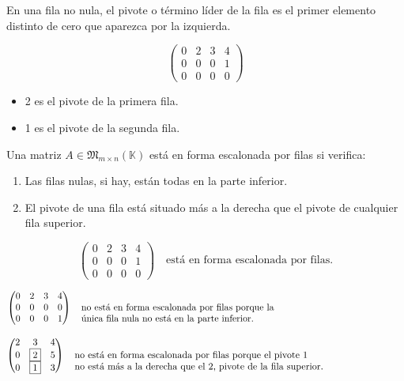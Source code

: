 \documentclass[a4paper,12pt]{article}
\begin{document}
\begin{procedimiento}[title=Pivote o término líder]
En una fila no nula, el pivote o término líder de la fila es el primer elemento distinto de cero que aparezca por la izquierda.
\end{procedimiento}

\begin{ejemplo}[title=Ejemplo de pivote]
\[
\begin{pmatrix}
0 & \boxed{2} & 3 & 4 \\
0 & 0 & 0 & \boxed{1} \\
0 & 0 & 0 & 0
\end{pmatrix}
\]

\begin{itemize}
\item 2 es el pivote de la primera fila.
\item 1 es el pivote de la segunda fila.
\end{itemize}
\end{ejemplo}

\begin{procedimiento}[title=Forma escalonada por filas]
Una matriz $A \in \mathfrak{M}_{m \times n}(\mathbb{K})$ está en forma escalonada por filas si verifica:
\begin{enumerate}
\item Las filas nulas, si hay, están todas en la parte inferior.
\item El pivote de una fila está situado más a la derecha que el pivote de cualquier fila superior.
\end{enumerate}
\end{procedimiento}

\begin{ejemplo}[title=Ejemplos de forma escalonada por filas]
\[
\begin{pmatrix}
0 & 2 & 3 & 4 \\
0 & 0 & 0 & 1 \\
0 & 0 & 0 & 0
\end{pmatrix}
\quad \text{está en forma escalonada por filas.}
\]

\[
\begin{pmatrix}
0 & 2 & 3 & 4 \\
0 & 0 & 0 & 0 \\
0 & 0 & 0 & 1
\end{pmatrix}
\quad
\text{\parbox[t]{1\textwidth}{no está en forma escalonada por filas porque la \\ única fila nula no está en la parte inferior.}}
\]

\[
\begin{pmatrix}
2 & 3 & 4 \\
0 & \boxed{2} & 5 \\
0 & \boxed{1} & 3
\end{pmatrix}
\quad
\text{\parbox[t]{1\textwidth}{no está en forma escalonada por filas porque el pivote 1 \\ no está más a la derecha que el 2, pivote de la fila superior.}}
\]
\end{ejemplo}
\end{document}
